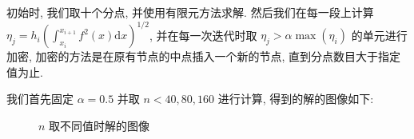 \documentclass[UTF8]{article}
\begin{document}
    初始时, 我们取十个分点, 并使用有限元方法求解.
    然后我们在每一段上计算 $\eta_j=h_i\left( \int_{x_i}^{x_{i+1}} f^2(x)\textrm{d}x \right)^{1/2}$, 并在每一次迭代时取 $\eta_j>\alpha \max(\eta_i)$ 的单元进行加密, 加密的方法是在原有节点的中点插入一个新的节点, 直到分点数目大于指定值为止.

    我们首先固定 $\alpha=0.5$ 并取 $n<40,80,160$ 进行计算, 得到的解的图像如下:

    \begin{figure}[h]
        \centering
        \caption{$n$ 取不同值时解的图像}
    \end{figure}
\end{document}
